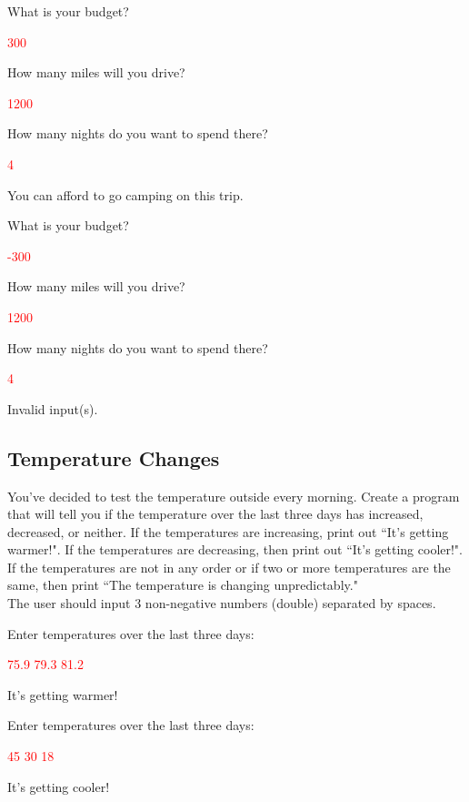 \begin{sample}
What is your budget?

\textcolor{red}{300}

How many miles will you drive?

\textcolor{red}{1200}

How many nights do you want to spend there?

\textcolor{red}{4}

You can afford to go camping on this trip.
\end{sample}

\begin{sample}
What is your budget?

\textcolor{red}{-300}

How many miles will you drive?

\textcolor{red}{1200}

How many nights do you want to spend there?

\textcolor{red}{4}

Invalid input(s).
\end{sample}

\subsection{Temperature Changes}

You've decided to test the temperature outside every morning. Create a program that will tell you if the temperature over the last three days has increased, decreased, or neither. If the temperatures are increasing, print out ``It's getting warmer!". If the temperatures are decreasing, then print out ``It's getting cooler!". If the temperatures are not in any order or if two or more temperatures are the same, then print ``The temperature is changing unpredictably." \\

The user should input 3 non-negative numbers (double) separated by spaces.

\begin{sample}
Enter temperatures over the last three days:

\textcolor{red}{75.9 79.3 81.2}

It's getting warmer!
\end{sample}

\begin{sample}
Enter temperatures over the last three days:

\textcolor{red}{45 30 18}

It's getting cooler!
\end{sample}

